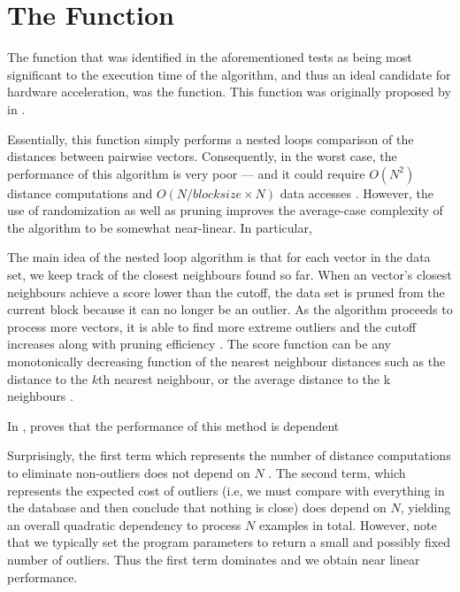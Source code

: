 \section{The Function}
\label{software:algorithmProfiling:theFunction}
The function that was identified in the aforementioned tests as being most
significant to the execution time of the  algorithm, and thus an ideal candidate for hardware acceleration, was the
 function. This function was originally
proposed by \citeauthor{Bay:2003} in .

Essentially, this function simply performs a nested loops comparison of the
distances between pairwise vectors. Consequently, in the worst case, the
performance of this algorithm is very poor --- and it could require $O(N^2)$
distance computations and $O(N/blocksize \times N)$ data accesses
\cite{Bay:2003}. However, the use of randomization as well as pruning improves
the average-case complexity of the algorithm to be somewhat near-linear. In
particular, \citeauthor{Bay:2003}

The main idea of the nested loop algorithm is that for each vector in the data
set, we keep track of the closest neighbours found so far. When an vector's
closest neighbours achieve a score lower than the cutoff, the data set is pruned
from the current block because it can no longer be an outlier. As the algorithm
proceeds to process more vectors, it is able to find more extreme outliers and
the cutoff increases along with pruning efficiency \cite{Bay:2003}. The score
function can be any monotonically decreasing function of the nearest neighbour
distances such as the distance to the $k$th nearest neighbour, or the average
distance to the k neighbours \cite{Bay:2003}.

In , \citeauthor{Bay:2003} proves that the performance of
this method is dependent

Surprisingly, the first term which represents the number of distance
computations to eliminate non-outliers does not depend on $N$ . The second term,
which represents the expected cost of outliers (i.e, we must compare with
everything in the database and then conclude that nothing is close) does depend
on $N$, yielding an overall quadratic dependency to process $N$ examples in
total. However, note that we typically set the program parameters to return a
small and possibly fixed number of outliers. Thus the first term dominates and
we obtain near linear performance.

